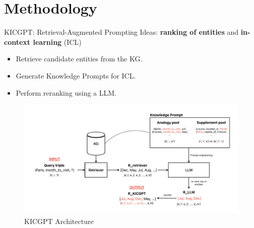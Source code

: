 \documentclass[aspectratio=169,xcolor=dvipsnames]{beamer}
\begin{document}
\section{Methodology}
\begin{frame}{KICGPT: Retrieval-Augmented Prompting}
    Ideas: \textbf{ranking of entities} and \textbf{in-context learning} (ICL)
    \begin{itemize}
        \item Retrieve candidate entities from the KG.
        \item Generate Knowledge Prompts for ICL.
        \item Perform reranking using a LLM.
    \end{itemize}
    \begin{figure}[h]
        \centering
        \includegraphics[width=0.8\linewidth]{images/KICGPT.pdf}
        \caption{KICGPT Architecture}
    \end{figure}
\end{frame}

\end{document}
